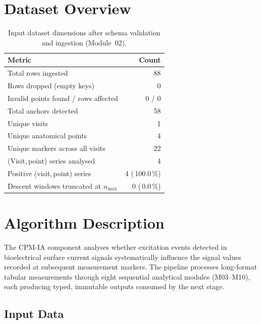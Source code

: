 \documentclass[a4paper,11pt]{article}
\begin{document}
\section{Dataset Overview}

\begin{table}[h!]
\centering
\small
\caption{Input dataset dimensions after schema validation and ingestion (Module~02).}
\begin{tabular}{lr}
\toprule
\textbf{Metric} & \textbf{Count} \\
\midrule
Total rows ingested                        & 88 \\
Rows dropped (empty keys)                  & 0 \\
Invalid points found / rows affected       & 0 / 0 \\
Total anchors detected                     & 58 \\
Unique visits                          & 1 \\
Unique anatomical points               & 4 \\
Unique markers across all visits       & 22 \\
(Visit,\,point) series analysed        & 4 \\
Positive (visit,\,point) series        & 4 (\,100.0\,\%) \\
Descent windows truncated at $n_{\max}$ & 0 (\,0.0\,\%) \\
\bottomrule
\end{tabular}
\end{table}

\section{Algorithm Description}

The CPM-IA component analyses whether excitation events detected in bioelectrical surface
current signals systematically influence the signal values recorded at subsequent measurement
markers. The pipeline processes long-format tabular measurements through eight sequential
analytical modules (M03--M10), each producing typed, immutable outputs consumed by the next
stage.

\subsection{Input Data}
\end{document}
